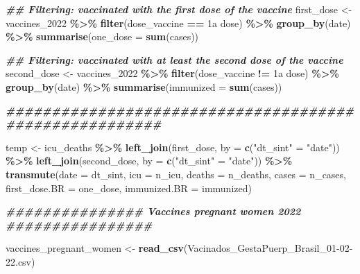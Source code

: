 \documentclass[
]{article}
\newenvironment{Shaded}{\begin{snugshade}}{\end{snugshade}}
\newcommand{\AttributeTok}[1]{\textcolor[rgb]{0.13,0.29,0.53}{#1}}
\newcommand{\DocumentationTok}[1]{\textcolor[rgb]{0.56,0.35,0.01}{\textbf{\textit{#1}}}}
\newcommand{\FunctionTok}[1]{\textcolor[rgb]{0.13,0.29,0.53}{\textbf{#1}}}
\newcommand{\NormalTok}[1]{#1}
\newcommand{\OtherTok}[1]{\textcolor[rgb]{0.56,0.35,0.01}{#1}}
\newcommand{\SpecialCharTok}[1]{\textcolor[rgb]{0.81,0.36,0.00}{\textbf{#1}}}
\newcommand{\StringTok}[1]{\textcolor[rgb]{0.31,0.60,0.02}{#1}}
\renewenvironment{Shaded}{\begin{mdframed}[ backgroundcolor=shadecolor, linecolor = shadecolor, leftmargin=\dimexpr\leftmargin-2pt\relax, innerleftmargin=1.6pt, innertopmargin=5pt, skipabove=10pt,skipbelow=3pt ]}{\end{mdframed}}
\begin{document}
\begin{Shaded}
\begin{Highlighting}[]
\DocumentationTok{\#\# Filtering: vaccinated with the first dose of the vaccine}
\NormalTok{first\_dose }\OtherTok{\textless{}{-}}\NormalTok{ vaccines\_2022 }\SpecialCharTok{\%\textgreater{}\%} 
  \FunctionTok{filter}\NormalTok{(dose\_vaccine }\SpecialCharTok{==} \StringTok{\textquotesingle{}1a dose\textquotesingle{}}\NormalTok{) }\SpecialCharTok{\%\textgreater{}\%}
  \FunctionTok{group\_by}\NormalTok{(date) }\SpecialCharTok{\%\textgreater{}\%} 
  \FunctionTok{summarise}\NormalTok{(}\AttributeTok{one\_dose =} \FunctionTok{sum}\NormalTok{(cases))}

\DocumentationTok{\#\# Filtering: vaccinated with at least the second dose of the vaccine}
\NormalTok{second\_dose }\OtherTok{\textless{}{-}}\NormalTok{ vaccines\_2022 }\SpecialCharTok{\%\textgreater{}\%} 
  \FunctionTok{filter}\NormalTok{(dose\_vaccine }\SpecialCharTok{!=} \StringTok{\textquotesingle{}1a dose\textquotesingle{}}\NormalTok{) }\SpecialCharTok{\%\textgreater{}\%}
  \FunctionTok{group\_by}\NormalTok{(date) }\SpecialCharTok{\%\textgreater{}\%} 
  \FunctionTok{summarise}\NormalTok{(}\AttributeTok{immunized =} \FunctionTok{sum}\NormalTok{(cases))}

\DocumentationTok{\#\#\#\#\#\#\#\#\#\#\#\#\#\#\#\#\#\#\#\#\#\#\#\#\#\#\#\#\#\#\#\#\#\#\#\#\#\#\#\#\#\#\#\#\#\#\#\#\#\#\#\#\#\#\#}

\NormalTok{temp }\OtherTok{\textless{}{-}}\NormalTok{  icu\_deaths }\SpecialCharTok{\%\textgreater{}\%} 
  \FunctionTok{left\_join}\NormalTok{(first\_dose, }\AttributeTok{by =} \FunctionTok{c}\NormalTok{(}\StringTok{"dt\_sint"} \OtherTok{=} \StringTok{"date"}\NormalTok{)) }\SpecialCharTok{\%\textgreater{}\%}
  \FunctionTok{left\_join}\NormalTok{(second\_dose, }\AttributeTok{by =} \FunctionTok{c}\NormalTok{(}\StringTok{"dt\_sint"} \OtherTok{=} \StringTok{"date"}\NormalTok{)) }\SpecialCharTok{\%\textgreater{}\%}
  \FunctionTok{transmute}\NormalTok{(}\AttributeTok{date =}\NormalTok{ dt\_sint,}
            \AttributeTok{icu =}\NormalTok{ n\_icu,}
            \AttributeTok{deaths =}\NormalTok{ n\_deaths,}
            \AttributeTok{cases =}\NormalTok{ n\_cases,}
            \AttributeTok{first\_dose.BR =}\NormalTok{ one\_dose,}
            \AttributeTok{immunized.BR =}\NormalTok{ immunized)}

\DocumentationTok{\#\#\#\#\#\#\#\#\#\#\#\#\#\#\# Vaccines pregnant women 2022 \#\#\#\#\#\#\#\#\#\#\#\#\#\#\#\#}

\NormalTok{vaccines\_pregnant\_women }\OtherTok{\textless{}{-}}
  \FunctionTok{read\_csv}\NormalTok{(}\StringTok{\textquotesingle{}Vacinados\_GestaPuerp\_Brasil\_01{-}02{-}22.csv\textquotesingle{}}\NormalTok{)}


\end{Highlighting}
\end{Shaded}
\end{document}
